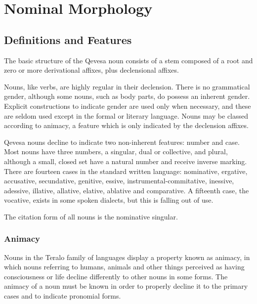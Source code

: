 \documentclass[grammar]{subfiles}
\begin{document}
	\chapter{Nominal Morphology}
	\label{ch:nominal_morphology}

	\section{Definitions and Features}
	\label{sec:nm_definition_features}

	The basic structure of the Qevesa noun consists of a stem composed of a root and zero or more derivational affixes, plus declensional affixes.

	Nouns, like verbs, are highly regular in their declension. There is no grammatical gender, although some nouns, such as body parts, do possess an inherent gender. Explicit constructions to indicate gender are used only when necessary, and these are seldom used except in the formal or literary language. Nouns may be classed according to animacy, a feature which is only indicated by the declension affixes.

	Qevesa nouns decline to indicate two non-inherent features: number and case. Most nouns have three numbers, a singular, dual or collective, and plural, although a small, closed set have a natural number and receive inverse marking. There are fourteen cases in the standard written language: nominative, ergative, accusative, secundative, genitive, essive, instrumental-commitative, inessive, adessive, illative, allative, elative, ablative and comparative. A fifteenth case, the vocative, exists in some spoken dialects, but this is falling out of use\footnotemark.

	The citation form of all nouns is the nominative singular.

	\subsection{Animacy}
	\label{ssec:nm_animacy}

	Nouns in the Teralo family of languages display a property known as animacy, in which nouns referring to humans, animals and other things perceived as having consciousness or life decline differently to other nouns in some forms. The animacy of a noun must be known in order to properly decline it to the primary cases and to indicate pronomial forms.
\end{document}
